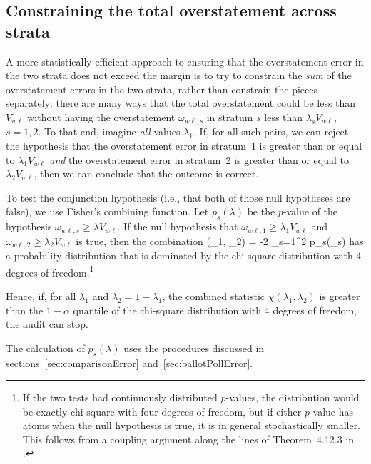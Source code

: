 \subsection{Constraining the total overstatement across strata}
A more statistically efficient approach to ensuring that the overstatement error in the 
two strata does not
exceed the margin is to try to constrain the \emph{sum} of the overstatement errors in the two
strata, rather than constrain the pieces separately:
there are many ways that the total overstatement could be less than $V_{w\ell}$ without
having the overstatement $\omega_{w\ell,s}$
in stratum $s$ less than $\lambda_s V_{w\ell}$, $s = 1, 2$.
To that end, imagine \emph{all} values $\lambda_1$.
If, for all such pairs, we can reject the hypothesis that the 
overstatement error in stratum~1 is greater than or equal to $\lambda_1 V_{w\ell}$ \emph{and} 
the overstatement error in stratum~2 is greater than or equal to $\lambda_2 V_{w\ell}$, then
we can conclude that the outcome is correct.

To test the conjunction hypothesis (i.e., that both of those null hypotheses are false), we use 
Fisher's combining function.
Let $p_s(\lambda)$ be the $p$-value of the hypothesis $\omega_{w\ell,s} \ge \lambda V_{w\ell}$.
If the null hypothesis that $\omega_{w\ell,1} \ge \lambda_1 V_{w\ell}$ and 
$\omega_{w\ell,2} \ge \lambda_2 V_{w\ell}$ is true, then the combination
\beq
   \chi(\lambda_1, \lambda_2) = -2 \sum_{s=1}^2 \ln p_s(\lambda_s)
\eeq
has a probability distribution that is dominated by the chi-square distribution with 4 degrees
of freedom.\footnote{%
   If the two tests had continuously distributed $p$-values, the distribution would be exactly
   chi-square with four degrees of freedom, but if either $p$-value has atoms when
   the null hypothesis is true, it is in general stochastically smaller.
   This follows from a coupling argument along the lines of Theorem~4.12.3 in \citet{grimmettStirzaker04}.
}

Hence, if, for all $\lambda_1$ and $\lambda_2 = 1- \lambda_1$,
the combined statistic $\chi(\lambda_1, \lambda_2)$ is greater than the 
$1-\alpha$ quantile of the chi-square
distribution with 4 degrees of freedom, the audit can stop.

The calculation of $p_s(\lambda)$ 
uses the procedures discussed in 
sections~\ref{sec:comparisonError} and~\ref{sec:ballotPollError}.